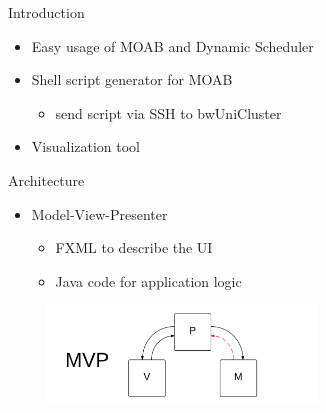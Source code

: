 
	\begin{frame}{Introduction}
		\begin{itemize}
			\pause
			\item Easy usage of MOAB and Dynamic Scheduler
			\pause
			\item Shell script generator for MOAB 
			\begin{itemize}
				\pause
				\item send script via SSH to bwUniCluster
			\end{itemize}
			\pause
			\item Visualization tool
			
		\end{itemize}
	\end{frame}
	
	\begin{frame}{Architecture}
		\begin{itemize}
	\pause
			\item Model-View-Presenter
			\begin{itemize}
				\pause
				\item FXML to describe the UI
				\pause
				\item Java code for application logic
			\end{itemize}
	        
				\includegraphics[width=300px, height=100px]{images/mvp.png}
		\end{itemize}
	\end{frame}
	
	
	

 

